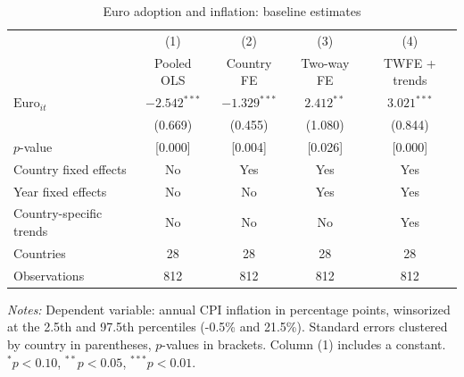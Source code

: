\begin{table}[htbp]\centering\small
\caption{Euro adoption and inflation: baseline estimates}\label{tab:main}
\begin{tabular}{lcccc}
\toprule
 & (1) & (2) & (3) & (4) \\
 & Pooled OLS & Country FE & Two-way FE & TWFE + trends \\
\midrule
$\text{Euro}_{it}$ & $-2.542^{***}$ & $-1.329^{***}$ & $2.412^{**}$ & $3.021^{***}$ \\
 & (0.669) & (0.455) & (1.080) & (0.844) \\
$p$-value & [0.000] & [0.004] & [0.026] & [0.000] \\[2pt]
\midrule
Country fixed effects & No & Yes & Yes & Yes \\
Year fixed effects & No & No & Yes & Yes \\
Country-specific trends & No & No & No & Yes \\
Countries & 28 & 28 & 28 & 28 \\
Observations & 812 & 812 & 812 & 812 \\
\bottomrule
\end{tabular}
\begin{minipage}{0.95\linewidth}\vspace{4pt}\footnotesize\textit{Notes:} Dependent variable: annual CPI inflation in percentage points, winsorized at the 2.5th and 97.5th percentiles (-0.5\% and 21.5\%). Standard errors clustered by country in parentheses, $p$-values in brackets. Column (1) includes a constant. $^{*}p<0.10$, $^{**}p<0.05$, $^{***}p<0.01$.\end{minipage}
\end{table}